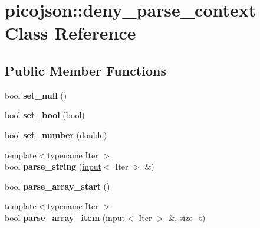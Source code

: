 \hypertarget{classpicojson_1_1deny__parse__context}{\section{picojson\+:\+:deny\+\_\+parse\+\_\+context Class Reference}
\label{classpicojson_1_1deny__parse__context}
}
\subsection*{Public Member Functions}
\begin{DoxyCompactItemize}
\item 
\hypertarget{classpicojson_1_1deny__parse__context_abadde692be9f70942cb31799292c2ad9}{bool {\bfseries set\+\_\+null} ()}\label{classpicojson_1_1deny__parse__context_abadde692be9f70942cb31799292c2ad9}

\item 
\hypertarget{classpicojson_1_1deny__parse__context_afc6a05e76120dd884da1ec4c8964f7b5}{bool {\bfseries set\+\_\+bool} (bool)}\label{classpicojson_1_1deny__parse__context_afc6a05e76120dd884da1ec4c8964f7b5}

\item 
\hypertarget{classpicojson_1_1deny__parse__context_aec324fbb7fea546b6e0673724873e1e1}{bool {\bfseries set\+\_\+number} (double)}\label{classpicojson_1_1deny__parse__context_aec324fbb7fea546b6e0673724873e1e1}

\item 
\hypertarget{classpicojson_1_1deny__parse__context_a2000b3dcc1fb70a4c795e834f9d3122f}{{\footnotesize template$<$typename Iter $>$ }\\bool {\bfseries parse\+\_\+string} (\hyperlink{classpicojson_1_1input}{input}$<$ Iter $>$ \&)}\label{classpicojson_1_1deny__parse__context_a2000b3dcc1fb70a4c795e834f9d3122f}

\item 
\hypertarget{classpicojson_1_1deny__parse__context_afbe65c8c2b2ada93595587432189d20f}{bool {\bfseries parse\+\_\+array\+\_\+start} ()}\label{classpicojson_1_1deny__parse__context_afbe65c8c2b2ada93595587432189d20f}

\item 
\hypertarget{classpicojson_1_1deny__parse__context_ae15be8ad932ec02751870e962e9d34bf}{{\footnotesize template$<$typename Iter $>$ }\\bool {\bfseries parse\+\_\+array\+\_\+item} (\hyperlink{classpicojson_1_1input}{input}$<$ Iter $>$ \&, size\+\_\+t)}\label{classpicojson_1_1deny__parse__context_ae15be8ad932ec02751870e962e9d34bf}


\end{DoxyCompactItemize}
